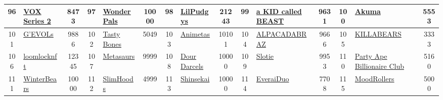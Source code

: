 \begin{table*}[]
{\begin{tabular}{|c|l|c|c|l|c|c|l|c|c|l|c|c|l|c|}
        96    & \href{http://collectvox.com}{VOX Series 2}                                         & 8473              & 97    & \href{http://www.wonderpals.com}{WonderPals}                                                      & 10000             & 98    & \href{https://www.pudgypenguins.com/}{LilPudgys}                                  & 21243             & 99    & \href{https://akidcalledbeast.com}{a KID called BEAST}                        & 9631              & 100   & \href{https://www.akumaorigins.com}{Akuma}                                                & 5553                                    \\ \hline
        101   & \href{http://gevols.com}{G’EVOLs}                                                  & 9886              & 102   & \href{https://tastybones.xyz/}{Tasty Bones}                                                       & 5049              & 103   & \href{https://animetaverse.club/}{Animetas}                                       & 10101             & 104   & \href{https://alpacadabraz.io/}{ALPACADABRAZ}                                 & 9666              & 105   & \href{http://killabears.com}{KILLABEARS}                                                  & 3333                                    \\ \hline
        106   & \href{https://loomlock.com}{loomlocknft}                                           & 12345             & 107   & \href{https://metasaurs.com}{Metasaurs}                                                           & 9999              & 108   & \href{http://dourdarcels.io}{Dour Darcels}                                        & 10000             & 109   & \href{https://www.slotie.com/}{Slotie}                                        & 9953              & 110   & \href{http://www.billionaireclubnft.com/}{Party Ape Billionaire Club}                     & 5160                                    \\ \hline
        111   & \href{http://winterbearsnft.com}{WinterBears}                                      & 10000             & 112   & \href{http://slimhoods.com}{SlimHoods}                                                            & 4999              & 113   & \href{http://shinsekai.io}{Shinsekai}                                             & 10000             & 114   & \href{https://everai.xyz}{EveraiDuo}                                          & 7708              & 115   & \href{https://moodrollers.com/}{MoodRollers}                                              & 5000                                    \\ \hline

\end{tabular}}
\end{table*}
